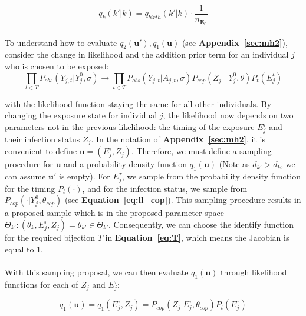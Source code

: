 \begin{equation}
q_k(k' | k) = q_{birth}(k' |k)\cdot \frac{1}{n_{\mathbf{E_0}}}
\end{equation}

\paragraph{}To understand how to evaluate $q_2(\mathbf{u}'), q_1(\mathbf{u})$ (see \textbf{Appendix~\ref{sec:mh2}}), consider the change in likelihood and the addition prior term for an individual $j$ who is chosen to be exposed:
\begin{equation}
\prod_{t \in T}P_{obs}(Y_{j,t}|Y^0_{j}, \sigma)  \rightarrow  \prod_{t \in T}P_{obs}(Y_{j,t}|A_{j,t}, \sigma)P_{cop}(Z_j \mid Y^0_{j}, \theta)P_t(E_j^t)
\end{equation}

with the likelihood function staying the same for all other individuals. By changing the exposure state for individual $j$, the likelihood now depends on two parameters not in the previous likelihood: the timing of the exposure $E^\tau_j$ and their infection status $Z_j$. In the notation of \textbf{Appendix~\ref{sec:mh2}}, it is convenient to define $\mathbf{u} = (E^\tau_j, Z_j)$. Therefore, we must define a sampling procedure for $\mathbf{u}$ and a probability density function $q_1(\mathbf{u})$ (Note as $d_{k'} > d_k$, we can assume $\mathbf{u'}$ is empty).  For $E^\tau_j$, we sample from the probability density function for the timing $P_t(\cdot)$, and for the infection status, we sample from $P_{cop}(\cdot | Y_j^0, \theta_{cop})$ (see \textbf{Equation~\ref{eq:ll_cop}}). This sampling procedure results in a proposed sample which is in the proposed parameter space $\Theta_{k'}: (\theta_k, E^\tau_j, Z_j) = \theta_{k'} \in \Theta_{k'}$. Consequently, we can choose the identify function for the required bijection $T$ in \textbf{Equation~\ref{eq:T}}, which means the Jacobian is equal to 1.
\paragraph{}With this sampling proposal, we can then evaluate $q_1(\mathbf{u})$ through likelihood functions for each of $Z_j$ and $E^\tau_j$:

\begin{equation}
q_1(\mathbf{u}) = q_1(E^\tau_j, Z_j) = P_{cop}(Z_j | E_j^\tau, \theta_{cop})P_t(E^\tau_j)
\end{equation}

